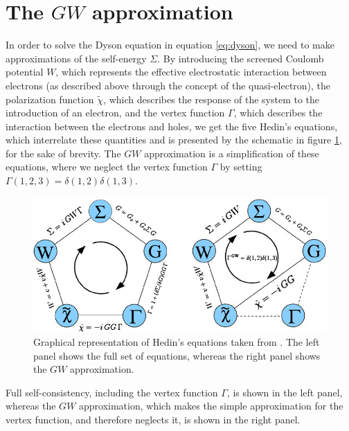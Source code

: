 \documentclass[12pt]{article}
\begin{document}
\section{The $GW$ approximation}
In order to solve the Dyson equation in equation \ref{eq:dyson}, we need to make approximations of the self-energy $\Sigma$. By introducing the screened Coulomb potential $W$, which represents the effective electrostatic interaction between electrons (as described above through the concept of the quasi-electron), the polarization function $\tilde{\chi}$, which describes the response of the system to the introduction of an electron, and the vertex function $\Gamma$, which describes the interaction between the electrons and holes, we get the five Hedin's equations\autocite{hedin_new_1965}, which interrelate these quantities and is presented by the schematic in figure \ref{fig:hedin}, for the sake of brevity. The $GW$ approximation is a simplification of these equations, where we neglect the vertex function $\Gamma$ by setting $\Gamma(1,2,3) = \delta(1,2) \delta(1,3)$.
\begin{figure}
    \centering
    \includegraphics[width=\textwidth]{Left-panel-Graphical-representation-of-Hedins-equations-Right-panel-The-four-coupled.jpg}
    \caption{Graphical representation of Hedin's equations taken from \textcite{noauthor_frontiers_nodate}. The left panel shows the full set of equations, whereas the right panel shows the $GW$ approximation.}
    \label{fig:hedin}
\end{figure}
Full self-consistency, including the vertex function $\Gamma$, is shown in the left panel, whereas the $GW$ approximation, which makes the simple approximation for the vertex function, and therefore neglects it, is shown in the right panel. 
\end{document}
